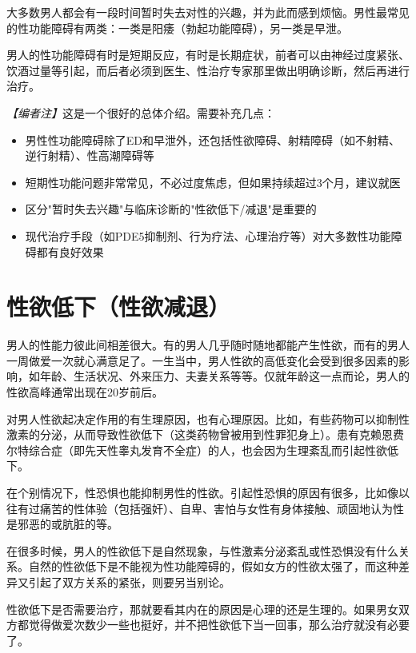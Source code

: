 大多数男人都会有一段时间暂时失去对性的兴趣，并为此而感到烦恼。男性最常见的性功能障碍有两类：一类是阳痿（勃起功能障碍），另一类是早泄。

男人的性功能障碍有时是短期反应，有时是长期症状，前者可以由神经过度紧张、饮酒过量等引起，而后者必须到医生、性治疗专家那里做出明确诊断，然后再进行治疗。

\noindent\textit{【编者注】}这是一个很好的总体介绍。需要补充几点：
\begin{itemize}
	\item 男性性功能障碍除了ED和早泄外，还包括性欲障碍、射精障碍（如不射精、逆行射精）、性高潮障碍等
	\item 短期性功能问题非常常见，不必过度焦虑，但如果持续超过3个月，建议就医
	\item 区分"暂时失去兴趣"与临床诊断的"性欲低下/减退"是重要的
	\item 现代治疗手段（如PDE5抑制剂、行为疗法、心理治疗等）对大多数性功能障碍都有良好效果
\end{itemize}

\section{性欲低下（性欲减退）}

男人的性能力彼此间相差很大。有的男人几乎随时随地都能产生性欲，而有的男人一周做爱一次就心满意足了。一生当中，男人性欲的高低变化会受到很多因素的影响，如年龄、生活状况、外来压力、夫妻关系等等。仅就年龄这一点而论，男人的性欲高峰通常出现在20岁前后。

对男人性欲起决定作用的有生理原因，也有心理原因。比如，有些药物可以抑制性激素的分泌，从而导致性欲低下（这类药物曾被用到性罪犯身上）。患有克赖恩费尔特综合症（即先天性睾丸发育不全症）的人，也会因为生理紊乱而引起性欲低下。

在个别情况下，性恐惧也能抑制男性的性欲。引起性恐惧的原因有很多，比如像以往有过痛苦的性体验（包括强奸）、自卑、害怕与女性有身体接触、顽固地认为性是邪恶的或肮脏的等。

在很多时候，男人的性欲低下是自然现象，与性激素分泌紊乱或性恐惧没有什么关系。自然的性欲低下是不能视为性功能障碍的，假如女方的性欲太强了，而这种差异又引起了双方关系的紧张，则要另当别论。

性欲低下是否需要治疗，那就要看其内在的原因是心理的还是生理的。如果男女双方都觉得做爱次数少一些也挺好，并不把性欲低下当一回事，那么治疗就没有必要了。

